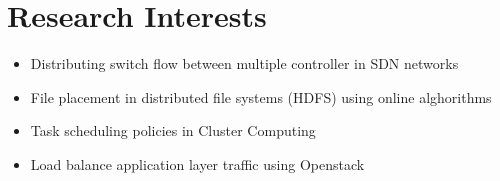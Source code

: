 \documentclass[a4paper,10pt]{article} %
\begin{document}
\color{blue}
\section{Research Interests}
\color{Black}
\begin{itemize}
	\item Distributing switch flow between multiple controller in SDN networks
	\item File placement in distributed file systems (HDFS) using online alghorithms
	\item Task scheduling policies in Cluster Computing
	\item Load balance application layer traffic using Openstack
					
	
		
	\end{itemize}
\end{document}
